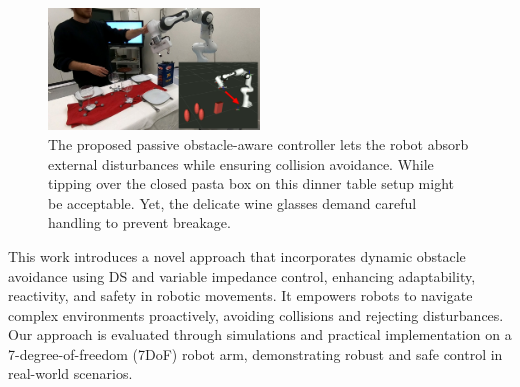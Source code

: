 \begin{figure}
\centerline{\includegraphics[width=0.5\textwidth]{figures/robot_arm_table_avoidance}}
\caption{
The proposed passive obstacle-aware controller lets the robot absorb external disturbances while ensuring collision avoidance. 
While tipping over the closed pasta box on this dinner table setup might be acceptable. Yet, the delicate wine glasses demand careful handling to prevent breakage.
}
\label{fig:table_avoidance_with_obstacle}
\end{figure}

This work introduces a novel approach that incorporates dynamic obstacle avoidance using DS and variable impedance control, enhancing adaptability, reactivity, and safety in robotic movements. It empowers robots to navigate complex environments proactively, avoiding collisions and rejecting disturbances. Our approach is evaluated through simulations and practical implementation on a 7-degree-of-freedom (7DoF) robot arm, demonstrating robust and safe control in real-world scenarios.

